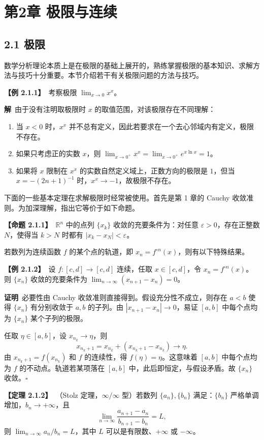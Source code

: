 \documentclass[UTF8,a4paper,11pt]{ctexart}
\newcommand{\ex}[1]{\par\medskip\noindent\textbf{【例 #1】}\ }
\newcommand{\prop}[1]{\par\medskip\noindent\textbf{【命题 #1】}\ }
\newcommand{\thm}[1]{\par\medskip\noindent\textbf{【定理 #1】}\ }
\newcommand{\pf}{\par\noindent\textbf{证明}\ }
\newcommand{\sol}{\par\noindent\textbf{解}\ }
\begin{document}
\section*{第2章 极限与连续}
\subsection*{2.1 极限}
数学分析理论本质上是在极限的基础上展开的，熟练掌握极限的基本知识、求解方法与技巧十分重要。本节介绍若干有关极限问题的方法与技巧。

\ex{2.1.1}考察极限 $\lim_{x\to0}x^x$。
\sol 由于没有注明取极限时 $x$ 的取值范围，对该极限存在不同理解：
\begin{enumerate}[label=（\arabic*）]
\item 当 $x<0$ 时，$x^x$ 并不总有定义，因此若要求在一个去心邻域内有定义，极限不存在。
\item 如果只考虑正的实数 $x$，则 $\lim_{x\to0^+}x^x=\lim_{x\to0^+}e^{x\ln x}=1$。
\item 如果将 $x$ 限制在 $x^x$ 的实数自然定义域上，正数方向的极限是 $1$，但当 $x=-(2n+1)^{-1}$ 时，$x^x\to-1$，故极限不存在。
\end{enumerate}

下面的一些基本定理在求解极限时经常被使用。首先是第 1 章的 Cauchy 收敛准则。为加深理解，指出它等价于如下命题。

\prop{2.1.1}$\mathbb R^n$ 中的点列 $\{x_k\}$ 收敛的充要条件为：对任意 $\varepsilon>0$，存在正整数 $N$，使得当 $k>N$ 时都有 $|x_k-x_N|<\varepsilon$。

若数列为连续函数 $f$ 的某个点的轨道，即 $x_n=f^{\circ n}(x)$，则有以下特殊结果。

\ex{2.1.2}设 $f:[c,d]\to[c,d]$ 连续，任取 $x\in[c,d]$，令 $x_n=f^{\circ n}(x)$。则 $\{x_n\}$ 收敛的充要条件为 $\lim_{n\to\infty}(x_{n+1}-x_n)=0$。
\pf 必要性由 Cauchy 收敛准则直接得到。假设充分性不成立，则存在 $a<b$ 使得 $\{x_n\}$ 有分别收敛于 $a,b$ 的子列。由 $|x_{n+1}-x_n|\to0$，易证 $[a,b]$ 中每个点均为 $\{x_n\}$ 某个子列的极限。

任取 $\eta\in[a,b]$，设 $x_{n_k}\to\eta$，则
\[
x_{n_k+1}=x_{n_k}+(x_{n_k+1}-x_{n_k})\longrightarrow\eta.
\]
由 $x_{n_k+1}=f(x_{n_k})$ 和 $f$ 的连续性，得 $f(\eta)=\eta$。这意味着 $[a,b]$ 中每个点均为 $f$ 的不动点。轨道若某项落在 $[a,b]$ 中，此后即恒定，与假设矛盾。故 $\{x_n\}$ 收敛。\hfill$\square$

\thm{2.1.2}（Stolz 定理，$\infty/\infty$ 型）若数列 $\{a_n\},\{b_n\}$ 满足：$\{b_n\}$ 严格单调增加，$b_n\to+\infty$，且
\[
\lim_{n\to\infty}\frac{a_{n+1}-a_n}{b_{n+1}-b_n}=L,
\]
则 $\lim_{n\to\infty}a_n/b_n=L$，其中 $L$ 可以是有限数、$+\infty$ 或 $-\infty$。
\end{document}
